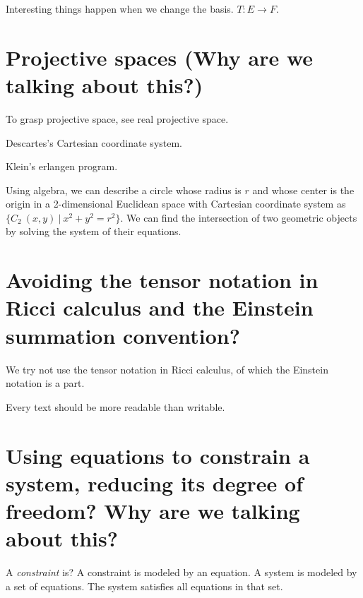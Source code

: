 Interesting things happen when we change the basis.
$T : E \to F$.

\section{Projective spaces (Why are we talking about this?)}

To grasp projective space, see real projective space.

Descartes's Cartesian coordinate system.

Klein's erlangen program.

Using algebra, we can describe a circle whose radius is $r$
and whose center is the origin in a 2-dimensional Euclidean space with Cartesian coordinate system
as $\{C_2~(x,y) ~|~ x^2+y^2 = r^2\}$.
We can find the intersection of two geometric objects
by solving the system of their equations.








\section{Avoiding the tensor notation in Ricci calculus and the Einstein summation convention?}

We try not use the tensor notation in Ricci calculus,
of which the Einstein notation is a part.

Every text should be more readable than writable.

\section{Using equations to constrain a system, reducing its degree of freedom? Why are we talking about this?}


A \emph{constraint} is?
A constraint is modeled by an equation.
A system is modeled by a set of equations.
The system satisfies all equations in that set.

